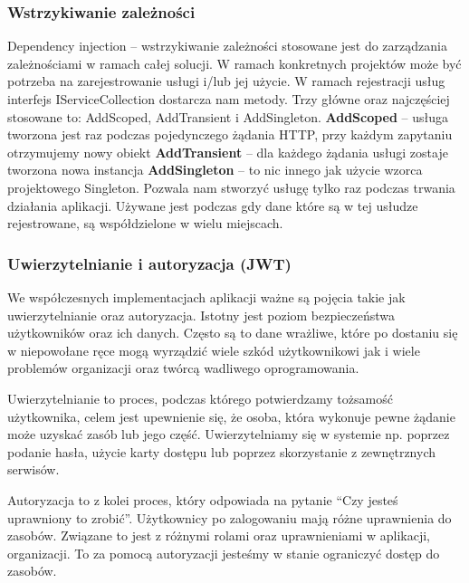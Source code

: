 \documentclass[a4paper,twoside,12pt]{book}
\begin{document}
\subsubsection{Wstrzykiwanie zależności}
Dependency injection – wstrzykiwanie zależności stosowane jest do zarządzania zależnościami w ramach całej solucji. W ramach konkretnych projektów może być potrzeba na zarejestrowanie usługi i/lub jej użycie. W ramach rejestracji usług interfejs IServiceCollection dostarcza nam metody. Trzy główne oraz najczęściej stosowane to: AddScoped, AddTransient i AddSingleton. 
\textbf{AddScoped} -- usługa tworzona jest raz podczas pojedynczego żądania HTTP, przy każdym zapytaniu otrzymujemy nowy obiekt 
\textbf{AddTransient} -- dla każdego żądania usługi zostaje tworzona nowa instancja 
\textbf{AddSingleton} -- to nic innego jak użycie wzorca projektowego Singleton. Pozwala nam stworzyć usługę tylko raz podczas trwania działania aplikacji. Używane jest podczas gdy dane które są w tej usłudze rejestrowane, są współdzielone w wielu miejscach. 


\subsubsection{Uwierzytelnianie i autoryzacja (JWT)}
We współczesnych implementacjach aplikacji ważne są pojęcia takie jak uwierzytelnianie oraz autoryzacja. Istotny jest poziom bezpieczeństwa użytkowników oraz ich danych. Często są to dane wrażliwe, które po dostaniu się w niepowołane ręce mogą wyrządzić wiele szkód użytkownikowi jak i wiele problemów organizacji oraz twórcą wadliwego oprogramowania. 

Uwierzytelnianie to proces, podczas którego potwierdzamy tożsamość użytkownika, celem jest upewnienie się, że osoba, która wykonuje pewne żądanie może uzyskać zasób lub jego część. Uwierzytelniamy się w systemie np. poprzez podanie hasła, użycie karty dostępu lub poprzez skorzystanie z zewnętrznych serwisów. 

Autoryzacja to z kolei proces, który odpowiada na pytanie “Czy jesteś uprawniony to zrobić”. Użytkownicy po zalogowaniu mają różne uprawnienia do zasobów. Związane to jest z różnymi rolami oraz uprawnieniami w aplikacji, organizacji. To za pomocą autoryzacji jesteśmy w stanie ograniczyć dostęp do zasobów. 
\end{document}
